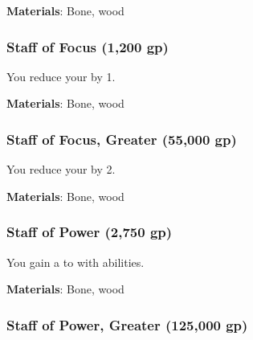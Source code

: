 \vspace{0.25em}
\textbf{Materials}: Bone, wood


\lowercase{\hypertarget{item:Staff of Focus}{}}\label{item:Staff of Focus}
\hypertarget{item:Staff of Focus}{\subsubsection{Staff of Focus\hfill{} (1,200 gp)}}

You reduce your  by 1.



\vspace{0.25em}
\textbf{Materials}: Bone, wood


\lowercase{\hypertarget{item:Staff of Focus, Greater}{}}\label{item:Staff of Focus, Greater}
\hypertarget{item:Staff of Focus, Greater}{\subsubsection{Staff of Focus, Greater\hfill{} (55,000 gp)}}

You reduce your  by 2.



\vspace{0.25em}
\textbf{Materials}: Bone, wood


\lowercase{\hypertarget{item:Staff of Power}{}}\label{item:Staff of Power}
\hypertarget{item:Staff of Power}{\subsubsection{Staff of Power\hfill{} (2,750 gp)}}

You gain a   to  with  abilities.



\vspace{0.25em}
\textbf{Materials}: Bone, wood


\lowercase{\hypertarget{item:Staff of Power, Greater}{}}\label{item:Staff of Power, Greater}
\hypertarget{item:Staff of Power, Greater}{\subsubsection{Staff of Power, Greater\hfill{} (125,000 gp)}}

